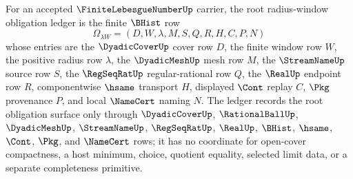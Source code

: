 \begin{definition}
\label{def:finite-lebesgue-number-root-radius-window-obligation-ledger}
For an accepted $\FiniteLebesgueNumberUp$ carrier, the root radius-window obligation ledger is the finite $\BHist$ row
$$
\Omega_{\lambda W}=(D,W,\lambda,M,S,Q,R,H,C,P,N)
$$
whose entries are the $\DyadicCoverUp$ cover row $D$, the finite window row $W$, the positive radius row $\lambda$, the $\DyadicMeshUp$ mesh row $M$, the $\StreamNameUp$ source row $S$, the $\RegSeqRatUp$ regular-rational row $Q$, the $\RealUp$ endpoint row $R$, componentwise $\hsame$ transport $H$, displayed $\Cont$ replay $C$, $\Pkg$ provenance $P$, and local $\NameCert$ naming $N$. The ledger records the root obligation surface only through $\DyadicCoverUp$, $\RationalBallUp$, $\DyadicMeshUp$, $\StreamNameUp$, $\RegSeqRatUp$, $\RealUp$, $\BHist$, $\hsame$, $\Cont$, $\Pkg$, and $\NameCert$ rows; it has no coordinate for open-cover compactness, a host minimum, choice, quotient equality, selected limit data, or a separate completeness primitive.
\end{definition}

